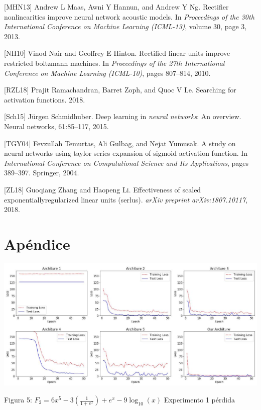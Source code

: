 \documentclass[10pt]{article}
\begin{document}
[MHN13] Andrew L Maas, Awni Y Hannun, and Andrew Y Ng. Rectifier nonlinearities improve neural network acoustic models. In \emph{Proceedings of the 30th International Conference on Machine Learning (ICML-13)}, volume 30, page 3, 2013.
\newline

[NH10] Vinod Nair and Geoffrey E Hinton. Rectified linear units improve restricted boltzmann machines. In \emph{Proceedings of the 27th International Conference on Machine Learning (ICML-10)}, pages 807–814, 2010.
\newline

[RZL18] Prajit Ramachandran, Barret Zoph, and Quoc V Le. Searching for activation functions. 2018.
\newline

[Sch15] Jürgen Schmidhuber. Deep learning in \emph{neural networks}: An overview. Neural
networks, 61:85–117, 2015.
\newline

[TGY04] Fevzullah Temurtas, Ali Gulbag, and Nejat Yumusak. A study on neural networks
using taylor series expansion of sigmoid activation function. In \emph{International Conference on Computational Science and Its Applications}, pages 389–397. Springer, 2004.
\newline

[ZL18] Guoqiang Zhang and Haopeng Li. Effectiveness of scaled exponentiallyregularized linear units (serlus). \emph{arXiv preprint arXiv:1807.10117}, 2018.

\section{Apéndice}
\includegraphics[max width=\textwidth]{2022_09_28_0067ec14010042dbf918g-09}

Figura 5: $F_{2}=6 x^{5}-3\left(\frac{1}{1+e^{x}}\right)+e^{x}-9 \log _{10}(x)$ Experimento 1 pérdida
\end{document}

